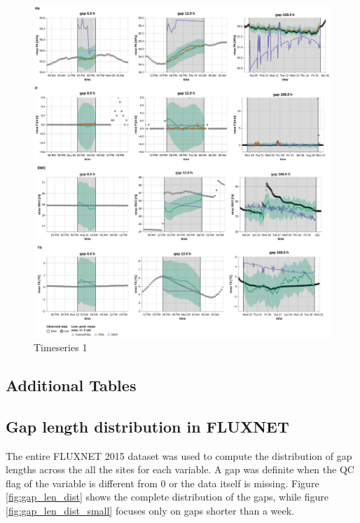\documentclass{article}
\newcommand{\imgwidth}{6in}
\let\Oldsubsection\subsection
\renewcommand{\subsection}{\FloatBarrier\Oldsubsection}
\begin{document}
\begin{figure}
\centerline{\includegraphics[width=\imgwidth]{images2/timeseries_2_2}}
\caption{Timeseries 1}
\label{fig:ts_3-2}
\end{figure}
\subsection{Additional Tables}












\subsection{Gap length distribution in FLUXNET}



The entire FLUXNET 2015 dataset was used to compute the distribution of gap lengths across the all the sites for each variable. A gap was definite when the QC flag of the variable is different from 0 or the data itself is missing. Figure \ref{fig:gap_len_dist} shows the complete distribution of the gaps, while figure \ref{fig:gap_len_dist_small} focuses only on gaps shorter than a week.
\end{document}
